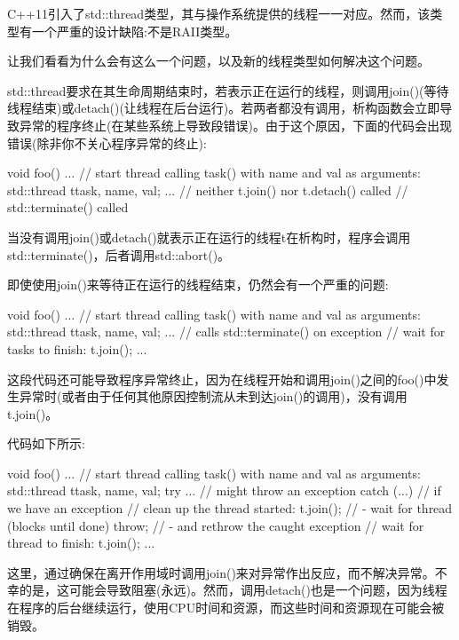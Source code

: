 
C++11引入了std::thread类型，其与操作系统提供的线程一一对应。然而，该类型有一个严重的设计缺陷:不是RAII类型。

让我们看看为什么会有这么一个问题，以及新的线程类型如何解决这个问题。


std::thread要求在其生命周期结束时，若表示正在运行的线程，则调用join()(等待线程结束)或detach()(让线程在后台运行)。若两者都没有调用，析构函数会立即导致异常的程序终止(在某些系统上导致段错误)。由于这个原因，下面的代码会出现错误(除非你不关心程序异常的终止):

\begin{cpp}
void foo()
{
	...
	// start thread calling task() with name and val as arguments:
	std::thread t{task, name, val};
	... // neither t.join() nor t.detach() called
} // std::terminate() called
\end{cpp}

当没有调用join()或detach()就表示正在运行的线程t在析构时，程序会调用std::terminate()，后者调用std::abort()。

即使使用join()来等待正在运行的线程结束，仍然会有一个严重的问题:

\begin{cpp}
void foo()
{
	...
	// start thread calling task() with name and val as arguments:
	std::thread t{task, name, val};
	... // calls std::terminate() on exception
	// wait for tasks to finish:
	t.join();
	...
}
\end{cpp}

这段代码还可能导致程序异常终止，因为在线程开始和调用join()之间的foo()中发生异常时(或者由于任何其他原因控制流从未到达join()的调用)，没有调用t.join()。

代码如下所示:

\begin{cpp}
void foo()
{
	...
	// start thread calling task() with name and val as arguments:
	std::thread t{task, name, val};
	try {
		... // might throw an exception
	}
	catch (...) { // if we have an exception
		// clean up the thread started:
		t.join(); // - wait for thread (blocks until done)
		throw; // - and rethrow the caught exception
	}
	// wait for thread to finish:
	t.join();
	...
}
\end{cpp}

这里，通过确保在离开作用域时调用join()来对异常作出反应，而不解决异常。不幸的是，这可能会导致阻塞(永远)。然而，调用detach()也是一个问题，因为线程在程序的后台继续运行，使用CPU时间和资源，而这些时间和资源现在可能会被销毁。

